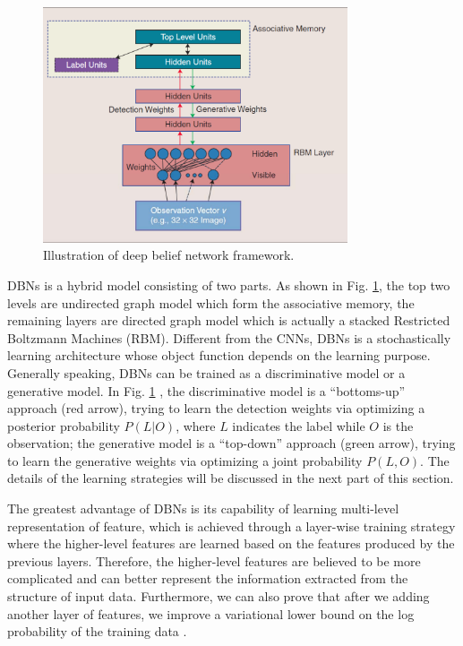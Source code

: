 \documentclass[conference]{IEEEtran}
\begin{document}
\begin{figure}[t]
\centering
\includegraphics[width=90mm]{dbn.pdf}
\caption{Illustration of deep belief network framework\cite{new_frontier}.}
\label{fig:dbn}
\end{figure}

DBNs is a hybrid model consisting of two parts. As shown in Fig. \ref{fig:dbn}, the top two levels are undirected graph model which form the associative memory, the remaining layers are directed graph model which is actually a stacked Restricted Boltzmann Machines (RBM). Different from the CNNs, DBNs is a stochastically learning architecture whose object
function depends on the learning purpose. Generally speaking, DBNs can be trained as a discriminative model or a generative model. In Fig. \ref{fig:dbn} , the discriminative model is a ``bottoms-up'' approach (red arrow), trying to
learn the detection weights via optimizing a posterior probability $P(L|O)$, where $L$ indicates the label while $O$ is the observation; the generative model is a ``top-down'' approach (green arrow), trying to learn the generative weights via optimizing a joint probability $P(L,O)$. The details of the learning strategies will be discussed in the next part of this section.

The greatest advantage of DBNs is its capability of learning multi-level representation of feature, which is achieved through a layer-wise training strategy where the higher-level features are learned based on the features produced by the previous layers. Therefore, the higher-level features are believed to be more complicated and can better represent the information extracted from the structure of input data. Furthermore, we can also prove that after we adding another layer of features, we improve a variational lower bound on the log probability of the training data \cite{Hinton}.
\end{document}
